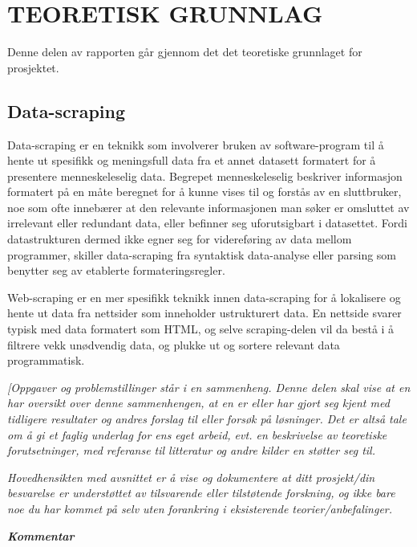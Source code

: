 \documentclass[../main.tex]{subfiles}
\begin{document}
\section{TEORETISK GRUNNLAG}

Denne delen av rapporten går gjennom det det teoretiske grunnlaget for prosjektet.

\subsection{Data-scraping}
Data-scraping er en teknikk som involverer bruken av software-program til å hente ut spesifikk og meningsfull data fra et annet datasett formatert for å presentere menneskeleselig data. Begrepet menneskeleselig beskriver informasjon formatert på en måte beregnet for å kunne vises til og forstås av en sluttbruker, noe som ofte innebærer at den relevante informasjonen man søker er omsluttet av irrelevant eller redundant data, eller befinner seg uforutsigbart i datasettet. Fordi datastrukturen dermed ikke egner seg for videreføring av data mellom programmer, skiller data-scraping fra syntaktisk data-analyse eller parsing som benytter seg av etablerte formateringsregler. 

Web-scraping er en mer spesifikk teknikk innen data-scraping for å lokalisere og hente ut data fra nettsider som inneholder ustrukturert data. En nettside svarer typisk med data formatert som HTML, og selve scraping-delen vil da bestå i å filtrere vekk unødvendig data, og plukke ut og sortere relevant data programmatisk.





\bigskip

{\itshape\color{blue}
[Oppgaver og problemstillinger st{\aa}r i en sammenheng. Denne delen skal vise at en har oversikt over denne
sammenhengen, at en er eller har gjort seg kjent med tidligere resultater og andres forslag til eller fors{\o}k p{\aa}
l{\o}sninger. Det er alts{\aa} tale om {\aa} gi et faglig underlag for ens eget arbeid, evt. en beskrivelse av
teoretiske forutsetninger, med referanse til litteratur og andre kilder en st{\o}tter seg til.}

{\itshape\color{blue}
Hovedhensikten med avsnittet er {\aa} vise og dokumentere at ditt prosjekt/din besvarelse er underst{\o}ttet av
tilsvarende eller tilst{\o}tende forskning, og ikke bare noe du har kommet p{\aa} selv uten forankring i eksisterende
teorier/anbefalinger.}

{\bfseries\itshape\color{blue}
Kommentar }
\end{document}
